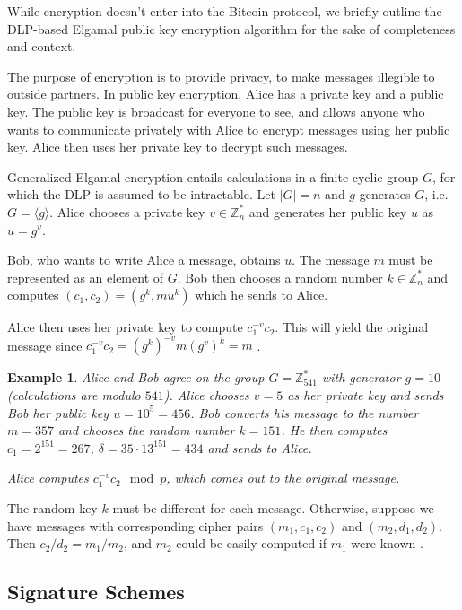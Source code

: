 \documentclass[a4paper,12pt]{article}
\newtheorem*{example}{Example}
\begin{document}
While encryption doesn't enter into the Bitcoin protocol, we briefly outline the DLP-based Elgamal public key encryption algorithm for the sake of completeness and context.

The purpose of encryption is to provide privacy, to make messages illegible to outside partners. In public key encryption, Alice has a private key and a public key. The public key is broadcast for everyone to see, and allows anyone who wants to communicate privately with Alice to encrypt messages using her public key. Alice then uses her private key to decrypt such messages.

Generalized Elgamal encryption entails calculations in a finite cyclic group $G$, for which the DLP is assumed to be intractable. Let $|G|=n$ and $g$ generates $G$, i.e. $G= \langle g \rangle$. Alice chooses a private key $v \in \mathbb{Z}_n^*$ and generates her public key $u$ as $u = g^v$.

Bob, who wants to write Alice a message, obtains $u$. The message $m$ must be represented as an element of $G$. Bob then chooses a random number $k \in \mathbb{Z}_n^*$ and computes $(c_1,c_2) = (g^k, mu^k)$ which he sends to Alice.

Alice then uses her private key to compute $c_1^{-v} c_2$. This will yield the original message since $c_1^{-v} c_2 = (g^k)^{-v} m (g^v)^k = m$ \cite[p. 297]{menezes}.

\begin{example} %
Alice and Bob agree on the group $G=\mathbb{Z}_{541}^*$ with generator $g = 10$ (calculations are modulo $541$). Alice chooses $v = 5$ as her private key and sends Bob her public key $u = 10^{5} = 456$. Bob converts his message to the number $m=357$ and chooses the random number $k=151$. He then computes $c_1 = 2^{151} = 267$, $\delta = 35 \cdot13^{151} = 434$ and sends to Alice.

Alice computes $c_1^{-v} c_2 \mod p$, which comes out to the original message.
\end{example}

The random key $k$ must be different for each message. Otherwise, suppose we have messages with corresponding cipher pairs $(m_1, c_1, c_2)$ and $(m_2, d_1, d_2)$. Then $c_2/d_2 = m_1/m_2$, and $m_2$ could be easily computed if $m_1$ were known \cite[p. 296]{menezes}.

\subsection{Signature Schemes}
\end{document}
